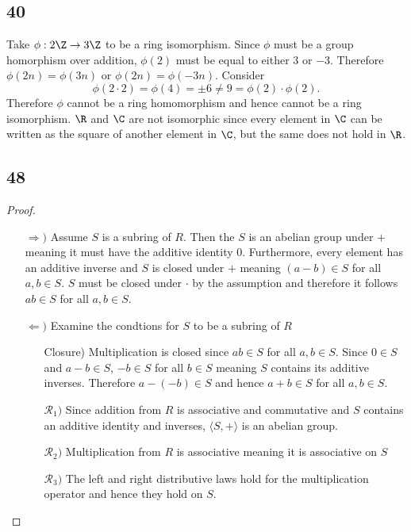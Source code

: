 \documentclass[12pt,titlepage]{extarticle}
\begin{document}
\subsection*{40}
Take $\phi : 2 \Z \to 3 \Z$ to be a ring isomorphism. Since $\phi$ must be a group homorphism over addition, $\phi(2)$ must be equal to either $3$ or $-3$. Therefore $\phi(2n) = \phi(3n)$ or $\phi(2n) = \phi(-3n)$. Consider
\[
    \phi(2 \cdot 2) = \phi(4) = \pm 6 \neq 9 = \phi(2) \cdot \phi(2)
.\]
Therefore $\phi$ cannot be a ring homomorphism and hence cannot be a ring isomorphism. $\R$ and $\C$ are not isomorphic since every element in $\C$ can be written as the square of another element in $\C$, but the same does not hold in $\R$.

\subsection*{48}
\begin{proof}
    \hfill\begin{enumerate}
        \item[$\Rightarrow)$]
            Assume $S$ is a subring of $R$. Then the $S$ is an abelian group under $+$ meaning it must have the additive identity $0$. Furthermore, every element has an additive inverse and $S$ is closed under $+$ meaning $(a - b) \in S$ for all $a,b \in S$. $S$ must be closed under $\cdot$ by the assumption and therefore it follows $ab \in S$ for all $a,b \in S$.
        \item[$\Leftarrow)$]
            Examine the condtions for $S$ to be a subring of $R$
            \begin{enumerate}
                \item[Closure)]
                    Multiplication is closed since $ab \in S$ for all $a,b \in S$. Since $0 \in S$ and $a - b \in S$, $-b \in S$ for all $b \in S$ meaning $S$ contains its additive inverses. Therefore $a - (-b) \in S$ and hence $a + b \in S$ for all $a,b \in S$.
                \item[$\mathcal{R}_1)$]
                    Since addition from $R$ is associative and commutative and $S$ contains an additive identity and inverses, $\langle S, + \rangle$ is an abelian group.
                \item[$\mathcal{R}_2)$]
                    Multiplication from $R$ is associative meaning it is associative on $S$
                \item[$\mathcal{R}_3)$]
                    The left and right distributive laws hold for the multiplication operator and hence they hold on $S$.
            \end{enumerate}
    \end{enumerate}
\end{proof}
\end{document}
